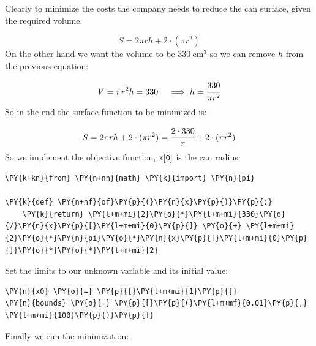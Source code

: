 Clearly to minimize the costs the company needs to reduce the can
surface, given the required volume.

\begin{equation} 
S = 2\pi rh + 2\cdot(\pi r^2) 
\end{equation}
On the other hand we want the volume to be \(330~\mathrm{cm}^3\) so we
can remove \(h\) from the previous equation:

\begin{equation} 
V = \pi r^2 h = 330\quad\implies h = \cfrac{330}{\pi r^2}
\end{equation}
So in the end the surface function to be minimized is:

\begin{equation}
S = 2\pi rh + 2\cdot(\pi r^2) = \cfrac{2\cdot 330}{r} + 2\cdot(\pi r^2)
\end{equation}
So we implement the objective function, \(\tt{x[0]}\) is the can radius:

\begin{tcolorbox}[breakable, size=fbox, boxrule=1pt, pad at break*=1mm,colback=cellbackground, colframe=cellborder]
\begin{Verbatim}[commandchars=\\\{\}]
\PY{k+kn}{from} \PY{n+nn}{math} \PY{k}{import} \PY{n}{pi}

\PY{k}{def} \PY{n+nf}{of}\PY{p}{(}\PY{n}{x}\PY{p}{)}\PY{p}{:}
    \PY{k}{return} \PY{l+m+mi}{2}\PY{o}{*}\PY{l+m+mi}{330}\PY{o}{/}\PY{n}{x}\PY{p}{[}\PY{l+m+mi}{0}\PY{p}{]} \PY{o}{+} \PY{l+m+mi}{2}\PY{o}{*}\PY{n}{pi}\PY{o}{*}\PY{n}{x}\PY{p}{[}\PY{l+m+mi}{0}\PY{p}{]}\PY{o}{*}\PY{o}{*}\PY{l+m+mi}{2}
\end{Verbatim}
\end{tcolorbox}

Set the limits to our unknown variable and its initial value:

\begin{tcolorbox}[breakable, size=fbox, boxrule=1pt, pad at break*=1mm,colback=cellbackground, colframe=cellborder]
\begin{Verbatim}[commandchars=\\\{\}]
\PY{n}{x0} \PY{o}{=} \PY{p}{[}\PY{l+m+mi}{1}\PY{p}{]}
\PY{n}{bounds} \PY{o}{=} \PY{p}{[}\PY{p}{(}\PY{l+m+mf}{0.01}\PY{p}{,} \PY{l+m+mi}{100}\PY{p}{)}\PY{p}{]}
\end{Verbatim}
\end{tcolorbox}
Finally we run the minimization:

